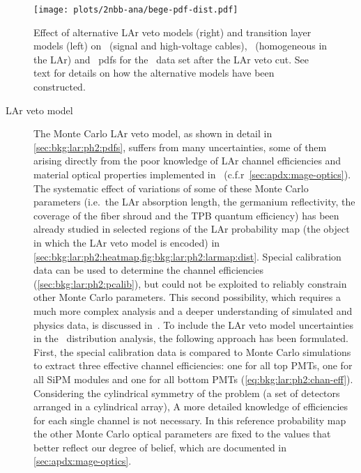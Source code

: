 \begin{figure}
  \centering
  \texttt{[image: plots/2nbb-ana/bege-pdf-dist.pdf]}
  \caption{%
    Effect of alternative LAr veto models (right) and transition layer models (left) on
    \kvn\ (signal and high-voltage cables), \kvz\ (homogeneous in the LAr) and \nnbb\
    pdfs for the \enrBEGeII\ data set after the LAr veto cut. See text for details on how
    the alternative models have been constructed.
  }\label{fig:2nbb-ana:pdf-dist}
\end{figure}

\begin{description}

  \item[LAr veto model] The Monte Carlo LAr veto model, as shown in detail in
    \cref{sec:bkg:lar:ph2:pdfs}, suffers from many uncertainties, some of them arising
    directly from the poor knowledge of LAr channel efficiencies and material optical
    properties implemented in \mage\ (c.f.r~\cref{sec:apdx:mage-optics}). The systematic
    effect of variations of some of these Monte Carlo parameters (i.e.~the LAr absorption
    length, the germanium reflectivity, the coverage of the fiber shroud and the TPB
    quantum efficiency) has been already studied in selected regions of the LAr
    probability map (the object in which the LAr veto model is encoded) in
    \cref{sec:bkg:lar:ph2:heatmap,fig:bkg:lar:ph2:larmap:dist}. Special calibration data
    can be used to determine the channel efficiencies (\cref{sec:bkg:lar:ph2:pcalib}), but
    could not be exploited to reliably constrain other Monte Carlo parameters. This second
    possibility, which requires a much more complex analysis and a deeper understanding of
    simulated and physics data, is discussed in~\cite{Wiesinger2021}.
    \newpar
    To include the LAr veto model uncertainties in the \nnbb\ distribution analysis, the
    following approach has been formulated. First, the special calibration data is
    compared to Monte Carlo simulations to extract three effective channel efficiencies:
    one for all top PMTs, one for all SiPM modules and one for all bottom PMTs
    (\cref{eq:bkg:lar:ph2:chan-eff}). Considering the cylindrical symmetry of the problem
    (a set of detectors arranged in a cylindrical array), A more detailed knowledge of
    efficiencies for each single channel is not necessary. In this reference probability
    map the other Monte Carlo optical parameters are fixed to the values that better
    reflect our degree of belief, which are documented in \cref{sec:apdx:mage-optics}.

\end{description}

